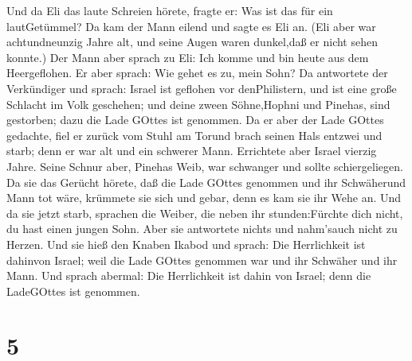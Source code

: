  Und da Eli das laute Schreien hörete, fragte er: Was ist
das für ein lautGetümmel? Da kam der Mann eilend und sagte es Eli an.
 (Eli aber war achtundneunzig Jahre alt, und seine Augen
waren dunkel,daß er nicht sehen konnte.)  Der Mann aber
sprach zu Eli: Ich komme und bin heute aus dem Heergeflohen. Er aber
sprach: Wie gehet es zu, mein Sohn?  Da antwortete der
Verkündiger und sprach: Israel ist geflohen vor denPhilistern, und ist
eine große Schlacht im Volk geschehen; und deine zween Söhne,Hophni und
Pinehas, sind gestorben; dazu die Lade GOttes ist genommen.
 Da er aber der Lade GOttes gedachte, fiel er zurück vom
Stuhl am Torund brach seinen Hals entzwei und starb; denn er war alt und
ein schwerer Mann. Errichtete aber Israel vierzig Jahre. 
Seine Schnur aber, Pinehas Weib, war schwanger und sollte
schiergeliegen. Da sie das Gerücht hörete, daß die Lade GOttes genommen
und ihr Schwäherund Mann tot wäre, krümmete sie sich und gebar, denn es
kam sie ihr Wehe an.  Und da sie jetzt starb, sprachen die
Weiber, die neben ihr stunden:Fürchte dich nicht, du hast einen jungen
Sohn. Aber sie antwortete nichts und nahm'sauch nicht zu Herzen.
 Und sie hieß den Knaben Ikabod und sprach: Die
Herrlichkeit ist dahinvon Israel; weil die Lade GOttes genommen war und
ihr Schwäher und ihr Mann.  Und sprach abermal: Die
Herrlichkeit ist dahin von Israel; denn die LadeGOttes ist genommen.

\hypertarget{section-4}{%
\section{5}\label{section-4}}

